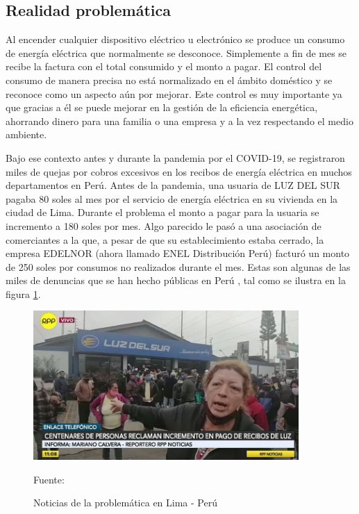 \documentclass[a4paper, 12pt]{article}
\begin{document}
\vspace{2.0cm}
\subsection{Realidad problemática}
Al encender cualquier dispositivo eléctrico u electrónico se produce un consumo de energía eléctrica que normalmente se desconoce. Simplemente a fin de mes se recibe la factura con el total consumido y el monto a pagar. El control del consumo de manera precisa no está normalizado en el ámbito doméstico y se reconoce como un aspecto aún por mejorar. Este control es muy importante ya que gracias a él se puede mejorar en la gestión de la eficiencia energética, ahorrando dinero para una familia o una empresa y a la vez respectando el medio ambiente.

\vspace{0.25cm}

Bajo ese contexto antes y durante la pandemia por el COVID-19, se registraron miles de quejas por cobros excesivos en los recibos de energía eléctrica en muchos departamentos en Perú. Antes de la pandemia, una usuaria de LUZ DEL SUR \citep{WEBSITE:32} pagaba 80 soles al mes por el servicio de energía eléctrica en su vivienda en la ciudad de Lima. Durante el problema el monto a pagar para la usuaria se incremento a 180 soles por mes. Algo parecido le pasó a una asociación de comerciantes a la que, a pesar de que su establecimiento estaba cerrado, la empresa EDELNOR (ahora llamado ENEL Distribución Perú) \citep{WEBSITE:33} \citep{WEBSITE:34} facturó un monto de 250 soles por consumos no realizados durante el mes. Estas son algunas de las miles de denuncias que se han hecho públicas en Perú \citep{WEBSITE:1}, tal como se ilustra en la figura \ref{fig:motivacion}.

\vspace{0.5cm}

\begin{figure}[ht]
\begin{center}
\includegraphics[width=0.9\textwidth]{motivacion}
\end{center}
\begin{center}
\vskip -0.5cm
\caption{\small{Noticias de la problemática en Lima - Perú}}
\label{fig:motivacion}
{\small{Fuente: \citep{WEBSITE:35}}}
\end{center}
\end{figure}
\end{document}

